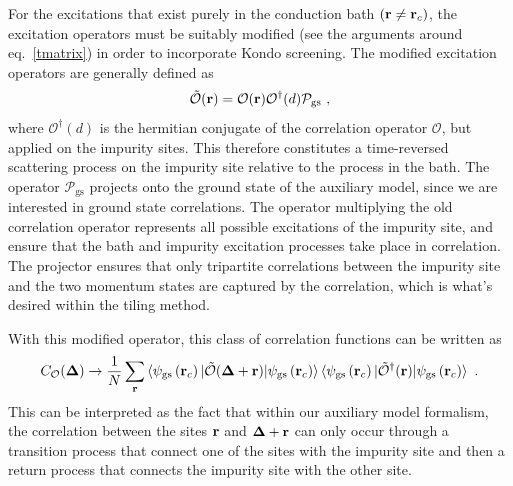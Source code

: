 \documentclass[reprint,hidelinks,onecolumn]{revtex4-2}
\begin{document}
For the excitations that exist purely in the conduction bath \(({\bf r} \neq {\bf r}_c)\), the excitation operators must be suitably modified (see the arguments around eq.~\ref{tmatrix}) in order to incorporate Kondo screening. The modified excitation operators are generally defined as
\begin{equation}\begin{aligned}\label{operatorTmatrix}
	\mathcal{\tilde O}({\bf r}) = \mathcal{O}({\bf r})\mathcal{O}^\dagger(d) \mathcal{P}_\text{gs} ~,
\end{aligned}\end{equation}
where \(\mathcal{O}^\dagger(d)\) is the hermitian conjugate of the correlation operator \(\mathcal{O}\), but applied on the impurity sites. This therefore constitutes a time-reversed scattering process on the impurity site relative to the process in the bath. The operator \(\mathcal{P}_\text{gs}\) projects onto the ground state of the auxiliary model, since we are interested in ground state correlations. The operator multiplying the old correlation operator represents all possible excitations of the impurity site, and ensure that the bath and impurity excitation processes take place in correlation. The projector ensures that only tripartite correlations between the impurity site and the two momentum states are captured by the correlation, which is what's desired within the tiling method.

With this modified operator, this class of correlation functions can be written as
\begin{equation}\begin{aligned}
	C_{\mathcal{O}}({\bf \Delta}) \to \frac{1}{N}\sum_{{\bf r} }\braket{\psi_\text{gs}\left({\bf r}_c\right) | \mathcal{\tilde O}({\bf \Delta} + {\bf r}) | \psi_\text{gs}\left({\bf r}_c\right)}\braket{\psi_\text{gs}\left({\bf r}_c\right) | \mathcal{\tilde O}^\dagger({\bf r}) | \psi_\text{gs}\left({\bf r}_c\right)}~.
\end{aligned}\end{equation}
This can be interpreted as the fact that within our auxiliary model formalism, the correlation between the sites \({\bf r}\) and \({\bf \Delta + r}\) can only occur through a transition process that connect one of the sites with the impurity site and then a return process that connects the impurity site with the other site.
\end{document}
